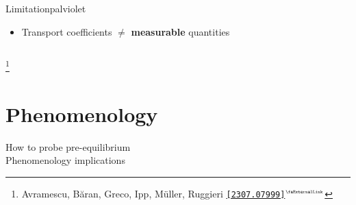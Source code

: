 \documentclass[aspectratio=169,11pt,usenames,dvipsnames]{beamer}
\renewcommand{\thefootnote}{\color{customblue}\faPaperPlaneO}
\newcommand\blfootnote[1]{%
  \begingroup
  \renewcommand\thefootnote{}\footnote{#1}%
  \addtocounter{footnote}{-1}%
  \endgroup
}
\begin{document}
\begin{frame}[noframenumbering]
\begin{columns}[onlytextwidth,t]
        \begin{custombox2}{Limitation}{palviolet}
            \small
            \begin{varwidth}{0.77\textwidth}
            \begin{itemize}\itemsep0em 
                \item Transport coefficients $\neq$ {\color{palviolet}\bfseries measurable} quantities
            \end{itemize}
            \end{varwidth}
        \end{custombox2} 
              
    \end{columns}
    \blfootnote{\scriptsize Avramescu, Băran, Greco, Ipp, Müller, Ruggieri  \href{https://arxiv.org/abs/2307.07999}{{\color{palgold}\texttt{[2307.07999]}$^\text{\tiny\faExternalLink}$}}}
\end{frame}


\section{Phenomenology}

\begin{frame}{}
    \begin{center}
        \vspace{1cm}
        {\large\color{normal}How to probe pre-equilibrium}\\[0.3cm]
        {\huge\color{destacado}Phenomenology implications}\\[0.3cm]
    \end{center}
\end{frame}
\end{document}

